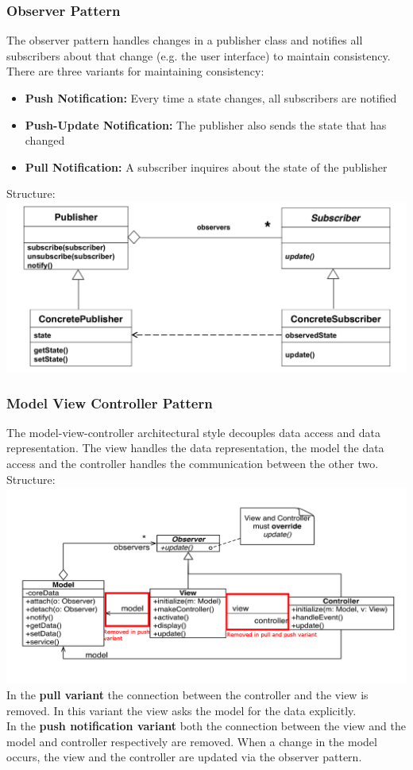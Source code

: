 \subsubsection{Observer Pattern}
The observer pattern handles changes in a publisher class and notifies all subscribers about that change (e.g. the user interface) to maintain consistency.
There are three variants for maintaining consistency:
\begin{itemize}
  \item \textbf{Push Notification:} Every time a state changes, all subscribers are notified
  \item \textbf{Push-Update Notification:} The publisher also sends the state that has changed
  \item \textbf{Pull Notification:} A subscriber inquires about the state of the publisher
\end{itemize}
Structure:\\
\includegraphics[width=\linewidth]{images/pattern_observer.png}
\newpage

\subsubsection{Model View Controller Pattern}
The model-view-controller architectural style decouples data access and data representation.
The view handles the data representation, the model the data access and the controller handles the communication between the other two.\\
Structure:\\
\includegraphics[width=\linewidth]{images/pattern_mvc.png}
In the \textbf{pull variant} the connection between the controller and the view is removed.
In this variant the view asks the model for the data explicitly.\\
In the \textbf{push notification variant} both the connection between the view and the model and controller respectively are removed.
When a change in the model occurs, the view and the controller are updated via the observer pattern.
\newpage

